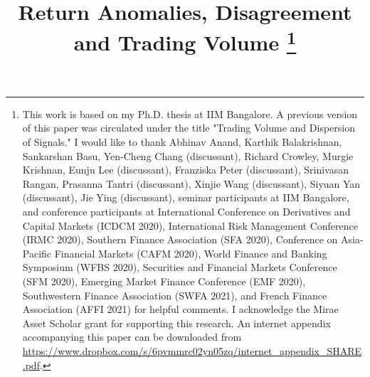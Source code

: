 \documentclass[
  12pt,
  a4paper,
  twoside,
  onecolumn]{article}
\author{}
\date{\vspace{-2.5em}}
\begin{document}
\renewcommand\bibsection{}



\newcommand*{\KEYWORDS}[1]{\textbf{Keywords:} #1}

\newcommand*{\JEL}[1]{\textbf{JEL Classification:} #1}

\newcommand*{\EMAIL}[1]{\emph{email}: \href{mailto:#1?subject=Regarding - Return Anomalies, Disagreement and Trading Volume}{\nolinkurl{#1}}}


\title{
  \textbf{Return Anomalies, Disagreement and Trading Volume}
  \thanks{\protect \linespread{1} \protect \selectfont \protect
    This work is based on my Ph.D. thesis at IIM Bangalore. A previous version of this paper was circulated under the title "Trading Volume and Dispersion of Signals." I would like to thank Abhinav Anand, Karthik Balakrishnan, Sankarshan Basu, Yen-Cheng Chang (discussant), Richard Crowley, Murgie Krishnan, Eunju Lee (discussant), Franziska Peter (discussant), Srinivasan Rangan, Prasanna Tantri (discussant), Xinjie Wang (discussant), Siyuan Yan (discussant), Jie Ying (discussant), seminar participants at IIM Bangalore, and conference participants at International Conference on Derivatives and Capital Markets (ICDCM 2020), International Risk Management Conference (IRMC 2020), Southern Finance Association (SFA 2020), Conference on Asia-Pacific Financial Markets (CAFM 2020), World Finance and Banking Symposium (WFBS 2020), Securities and Financial Markets Conference (SFM 2020), Emerging Market Finance Conference (EMF 2020), Southwestern Finance Association (SWFA 2021), and French Finance Association (AFFI 2021) for helpful comments. I acknowledge the Mirae Asset Scholar grant for supporting this research. An internet appendix accompanying this paper can be downloaded from \url{https://www.dropbox.com/s/6pvmmrc02yn05zq/internet_appendix_SHARE.pdf}.}
}
\end{document}
